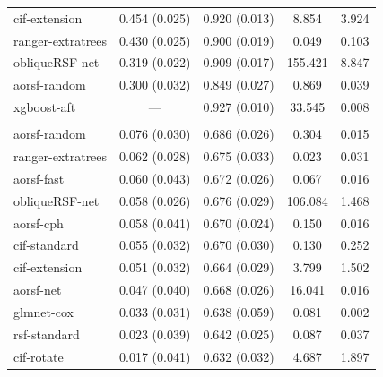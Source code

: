 \documentclass{article}\usepackage[]{graphicx}\usepackage[]{xcolor}
\newenvironment{knitrout}{}{} %
\begin{document}
\begin{knitrout}
\begin{longtable}[t]{lcccc}
\hspace{1em}cif-extension & 0.454 (0.025) & 0.920 (0.013) & 8.854 & 3.924\\
\hspace{1em}ranger-extratrees & 0.430 (0.025) & 0.900 (0.019) & 0.049 & 0.103\\
\hspace{1em}obliqueRSF-net & 0.319 (0.022) & 0.909 (0.017) & 155.421 & 8.847\\
\hspace{1em}aorsf-random & 0.300 (0.032) & 0.849 (0.027) & 0.869 & 0.039\\
\hspace{1em}xgboost-aft & --- & 0.927 (0.010) & 33.545 & 0.008\\
\addlinespace[0.3em]
\multicolumn{5}{l}{\textit{\textbf{NCCTG Lung Cancer; death, n = 228, p = 9}}}\\
\hline
\hspace{1em}aorsf-random & 0.076 (0.030) & 0.686 (0.026) & 0.304 & 0.015\\
\hspace{1em}ranger-extratrees & 0.062 (0.028) & 0.675 (0.033) & 0.023 & 0.031\\
\hspace{1em}aorsf-fast & 0.060 (0.043) & 0.672 (0.026) & 0.067 & 0.016\\
\hspace{1em}obliqueRSF-net & 0.058 (0.026) & 0.676 (0.029) & 106.084 & 1.468\\
\hspace{1em}aorsf-cph & 0.058 (0.041) & 0.670 (0.024) & 0.150 & 0.016\\
\hspace{1em}cif-standard & 0.055 (0.032) & 0.670 (0.030) & 0.130 & 0.252\\
\hspace{1em}cif-extension & 0.051 (0.032) & 0.664 (0.029) & 3.799 & 1.502\\
\hspace{1em}aorsf-net & 0.047 (0.040) & 0.668 (0.026) & 16.041 & 0.016\\
\hspace{1em}glmnet-cox & 0.033 (0.031) & 0.638 (0.059) & 0.081 & 0.002\\
\hspace{1em}rsf-standard & 0.023 (0.039) & 0.642 (0.025) & 0.087 & 0.037\\
\hspace{1em}cif-rotate & 0.017 (0.041) & 0.632 (0.032) & 4.687 & 1.897\\

\end{longtable}
\end{knitrout}
\end{document}
